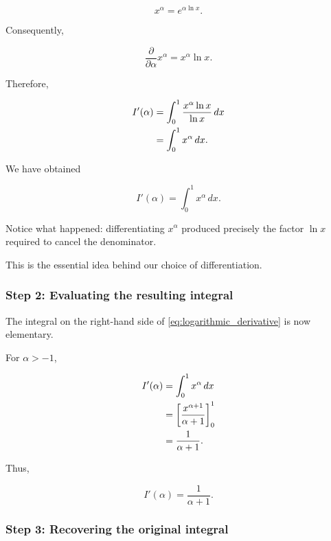\documentclass[11pt,a4paper]{article}
\theoremstyle{definition}
\theoremstyle{remark}
\begin{document}
\[
    x^\alpha=e^{\alpha\ln x}.
\]

Consequently,

\begin{equation}
    \frac{\partial}{\partial\alpha}
    x^\alpha
    =
    x^\alpha\ln x.
\end{equation}

Therefore,

\begin{align}
    I'(\alpha)
    &=
    \int_0^1
    \frac{x^\alpha\ln x}{\ln x}\,dx
    \notag\\
    &=
    \int_0^1 x^\alpha\,dx.
\end{align}

We have obtained

\begin{equation}
    \boxed{
    I'(\alpha)
    =
    \int_0^1 x^\alpha\,dx.
    }
    \label{eq:logarithmic_derivative}
\end{equation}

Notice what happened:
differentiating $x^\alpha$
produced precisely the factor
$\ln x$ required to cancel
the denominator.

This is the essential idea
behind our choice of
differentiation.

\subsubsection*{Step 2: Evaluating the resulting integral}

The integral on the right-hand
side of
\eqref{eq:logarithmic_derivative}
is now elementary.

For $\alpha>-1$,

\begin{align}
    I'(\alpha)
    &=
    \int_0^1 x^\alpha\,dx
    \notag\\
    &=
    \left[
    \frac{x^{\alpha+1}}{\alpha+1}
    \right]_0^1
    \notag\\
    &=
    \frac{1}{\alpha+1}.
\end{align}

Thus,

\begin{equation}
    \boxed{
    I'(\alpha)=\frac{1}{\alpha+1}.
    }
    \label{eq:logarithmic_differential}
\end{equation}

\subsubsection*{Step 3: Recovering the original integral}
\end{document}
